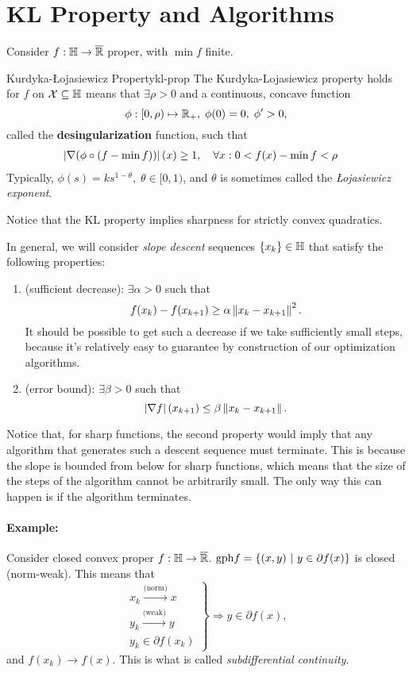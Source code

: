 \section{KL Property and Algorithms}

Consider $f : \mathbb{H} \to \overline{\mathbb{R}}$ proper, with $\min f$ finite.

\begin{cdefinition}{Kurdyka-{\L}ojasiewicz Property}{kl-prop}
	The Kurdyka-Lojasiewicz property holds for $f$ on $\mathcal{X} \subseteq \mathbb{H}$
	means that $\exists \rho > 0$ and a continuous, concave function
	\[
		\phi: [0, \rho) \mapsto \mathbb{R}_+, \; \phi(0) = 0, \; \phi' > 0,
	\]
	called the \textbf{desingularization} function, such that
	\begin{align*}
		\left| \nabla (\phi \circ (f - \min f)) \right|(x) &\geq 1, \quad
		\forall x : 0 < f(x) - \min f < \rho
	\end{align*}
	Typically, $\phi(s) = k s^{1 - \theta}, \; \theta \in [0, 1)$, and $\theta$
	is sometimes called the \textit{{\L}ojasiewicz exponent}.
\end{cdefinition}
Notice that the KL property implies sharpness for strictly convex quadratics.

In general, we will consider \textit{slope descent} sequences $\left\{ x_k \right\} \in
\mathbb{H}$ that satisfy the following properties:
\begin{enumerate}
	\item (sufficient decrease): $\exists \alpha > 0$ such that
		\[
			f(x_k) - f(x_{k+1}) \geq \alpha \left \| x_k - x_{k+1} \right \|^2.
		\]
		It should be possible to get such a decrease if we take sufficiently
		small steps, because it's relatively easy to guarantee by construction
		of our optimization algorithms.
	\item (error bound): $\exists \beta > 0$ such that
		\[
			\left| \nabla f \right|(x_{k+1}) \leq \beta \left \| x_k - x_{k+1} \right \|.
		\]
\end{enumerate}
Notice that, for sharp functions, the second property would imply that any
algorithm that generates such a descent sequence must terminate. This is
because the slope is bounded from below for sharp functions, which means that
the size of the steps of the algorithm cannot be arbitrarily small. The only
way this can happen is if the algorithm terminates.

\paragraph{Example:} Consider closed convex proper $f: \mathbb{H} \to
\overline{\mathbb{R}}$. $\mathrm{gph} f = \left\{ (x, y) \ \middle| \  y \in \partial f(x) \right\}$ is
closed (norm-weak). This means that
\[
	\left. \begin{array}{c}
		x_k \overset{\text{(norm)}}{\to} x \\
		y_k \overset{\text{(weak)}}{\to} y \\
		y_k \in \partial f(x_k)
	\end{array} \right\} \Rightarrow y \in \partial f(x),
\]
and $f(x_k) \to f(x)$. This is what is called \textit{subdifferential
continuity}.

